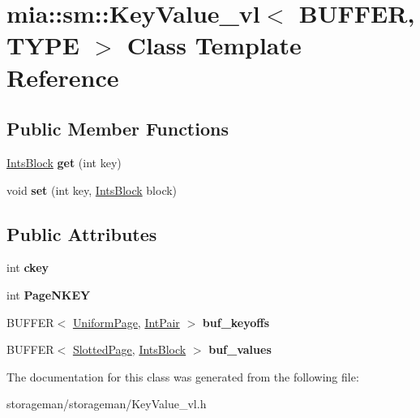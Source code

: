 \hypertarget{classmia_1_1sm_1_1_key_value__vl}{\section{mia\-:\-:sm\-:\-:Key\-Value\-\_\-vl$<$ B\-U\-F\-F\-E\-R, T\-Y\-P\-E $>$ Class Template Reference}
\label{classmia_1_1sm_1_1_key_value__vl}
}
\subsection*{Public Member Functions}
\begin{DoxyCompactItemize}
\item 
\hypertarget{classmia_1_1sm_1_1_key_value__vl_a9665521d6b2bb32aca967ee9784052b6}{\hyperlink{classmia_1_1sm_1_1_ints_block}{Ints\-Block} {\bfseries get} (int key)}\label{classmia_1_1sm_1_1_key_value__vl_a9665521d6b2bb32aca967ee9784052b6}

\item 
\hypertarget{classmia_1_1sm_1_1_key_value__vl_a460a87329112fca6b893c7167d1320e9}{void {\bfseries set} (int key, \hyperlink{classmia_1_1sm_1_1_ints_block}{Ints\-Block} block)}\label{classmia_1_1sm_1_1_key_value__vl_a460a87329112fca6b893c7167d1320e9}

\end{DoxyCompactItemize}
\subsection*{Public Attributes}
\begin{DoxyCompactItemize}
\item 
\hypertarget{classmia_1_1sm_1_1_key_value__vl_ad303ff8a508197039fed3ef8fd4ce0b7}{int {\bfseries ckey}}\label{classmia_1_1sm_1_1_key_value__vl_ad303ff8a508197039fed3ef8fd4ce0b7}

\item 
\hypertarget{classmia_1_1sm_1_1_key_value__vl_a9c7d8b261317031477d6153cc8d26afc}{int {\bfseries Page\-N\-K\-E\-Y}}\label{classmia_1_1sm_1_1_key_value__vl_a9c7d8b261317031477d6153cc8d26afc}

\item 
\hypertarget{classmia_1_1sm_1_1_key_value__vl_a8eb8938e346bf18cc128cf894e5fbc05}{B\-U\-F\-F\-E\-R$<$ \hyperlink{classmia_1_1sm_1_1_uniform_page}{Uniform\-Page}, \hyperlink{classmia_1_1sm_1_1_int_pair}{Int\-Pair} $>$ {\bfseries buf\-\_\-keyoffs}}\label{classmia_1_1sm_1_1_key_value__vl_a8eb8938e346bf18cc128cf894e5fbc05}

\item 
\hypertarget{classmia_1_1sm_1_1_key_value__vl_a35620180baa6b260035f0b35f11ea319}{B\-U\-F\-F\-E\-R$<$ \hyperlink{classmia_1_1sm_1_1_slotted_page}{Slotted\-Page}, \hyperlink{classmia_1_1sm_1_1_ints_block}{Ints\-Block} $>$ {\bfseries buf\-\_\-values}}\label{classmia_1_1sm_1_1_key_value__vl_a35620180baa6b260035f0b35f11ea319}

\end{DoxyCompactItemize}


The documentation for this class was generated from the following file\-:\begin{DoxyCompactItemize}
\item 
storageman/storageman/Key\-Value\-\_\-vl.\-h\end{DoxyCompactItemize}
